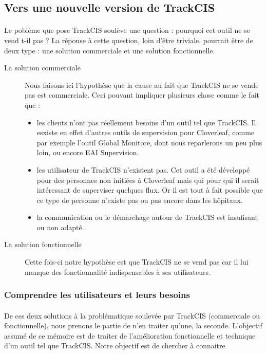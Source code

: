 	\subsection{Vers une nouvelle version de TrackCIS}
		\paragraph{}%
		Le poblème que pose TrackCIS soulève une question : pourquoi cet outil ne se
		vend t-il pas ? La réponse à cette question, loin d'être triviale, pourrait
		être de deux type : une solution commerciale et une solution fonctionnelle.
		\begin{description}
			\item[La solution commerciale] Nous faisons ici l'hypothèse que la cause au
			fait que TrackCIS ne se vende pas est commerciale. Ceci pouvant impliquer
			plusieurs chose comme le fait que :
			\begin{itemize}
			  \item les clients n'ont pas réellement besoins d'un outil tel que TrackCIS.
			  Il esxiste en effet d'autres outils de supervision pour Cloverleaf, comme
			  par exemple l'outil Global Monitore, dont nous reparlerons un peu plus
			  loin, ou encore EAI Supervision.
			  \item les utilisateur de TrackCIS n'existent pas. Cet outil a été développé
			  pour des personnes non initiées à Cloverleaf mais qui pour qui il serait
			  intéressant de superviser quelques flux.
			  Or il est tout à fait possible que ce type de personne n'existe pas ou pas
			  encore dans les hôpitaux.
			  \item la communication ou le démarchage autour de TrackCIS est insufisant
			  ou non adapté.
			\end{itemize}
			\item[La solution fonctionnelle] Cette fois-ci notre hypothèse est que
			TrackCIS ne se vend pas car il lui manque des fonctionnalité indispensables à
			ses utilisateurs.
		\end{description}
		
		\subsubsection{Comprendre les utilisateurs et leurs besoins}
			\paragraph{}%
			De ces deux solutions à la problématique soulevée par TrackCIS (commerciale
			ou fonctionnelle), nous prenons le partie de n'en traiter qu'une, la
			seconde.\newline
			L'objectif assumé de ce mémoire est de traiter de l'amélioration
			fonctionnelle et technique d'un outil tel que TrackCIS. Notre objectif est de
			chercher à connaitre
			
